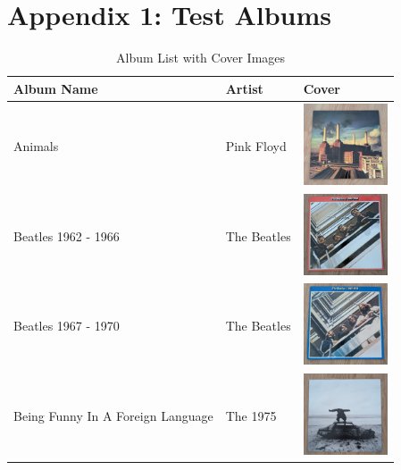 \chapter{Appendix 1: Test Albums} \label{apd:test_albums}
\begin{table}[h]
    \centering
    \renewcommand{\arraystretch}{1.5} %
    \setlength{\tabcolsep}{10pt}      %
    \begin{tabular}{|m{4cm}|m{4cm}|m{4cm}|} %
        \hline
        \textbf{Album Name} & \textbf{Artist} & \textbf{Cover} \\
        \hline
        Animals & Pink Floyd & \includegraphics[width=2.5cm]{figures/test_albums/Animals.jpg} \\
        \hline
        Beatles 1962 - 1966 & The Beatles & \includegraphics[width=2.5cm]{figures/test_albums/Beatles 62-66.jpg} \\
        \hline
        Beatles 1967 - 1970 & The Beatles & \includegraphics[width=2.5cm]{figures/test_albums/Beatles 67-70.jpg} \\
        \hline
        Being Funny In A Foreign Language & The 1975 & \includegraphics[width=2.5cm]{figures/test_albums/Being Funny In A Foreign Language.jpg} \\
        \hline
    \end{tabular}
    \caption{Album List with Cover Images}
    \label{tab:albums-list1}
\end{table}

